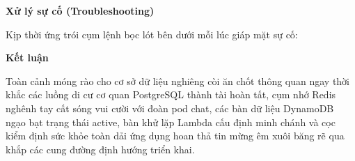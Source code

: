 \vspace{0.5em}\noindent\textbf{Xử lý sự cố
(Troubleshooting)}\par

Kịp thời ứng trói cụm lệnh bọc lót bên dưới mỗi lúc giáp mặt sự cố:

\begin{Shaded}
\begin{Highlighting}[]
\OperatorTok{=}
\OperatorTok{=}
\OperatorTok{=}
\OperatorTok{=}
\end{Highlighting}
\end{Shaded}

\vspace{0.5em}\noindent\textbf{Kết luận}\par

Toàn cảnh móng rào cho cơ sở dữ liệu nghiêng còi ăn chốt thông quan ngay
thời khắc các luồng di cư cơ quan PostgreSQL thành tài hoàn tất, cụm nhớ
Redis nghênh tay cất sóng vui cười với đoàn pod chat, các bàn dữ liệu
DynamoDB ngạo bạt trạng thái active, bàn khử lặp Lambda cấu định minh
chánh và cọc kiểm định sức khỏe toàn dải ứng dụng hoan thả tin mừng êm
xuôi băng rẽ qua khắp các cung đường định hướng triển khai.
